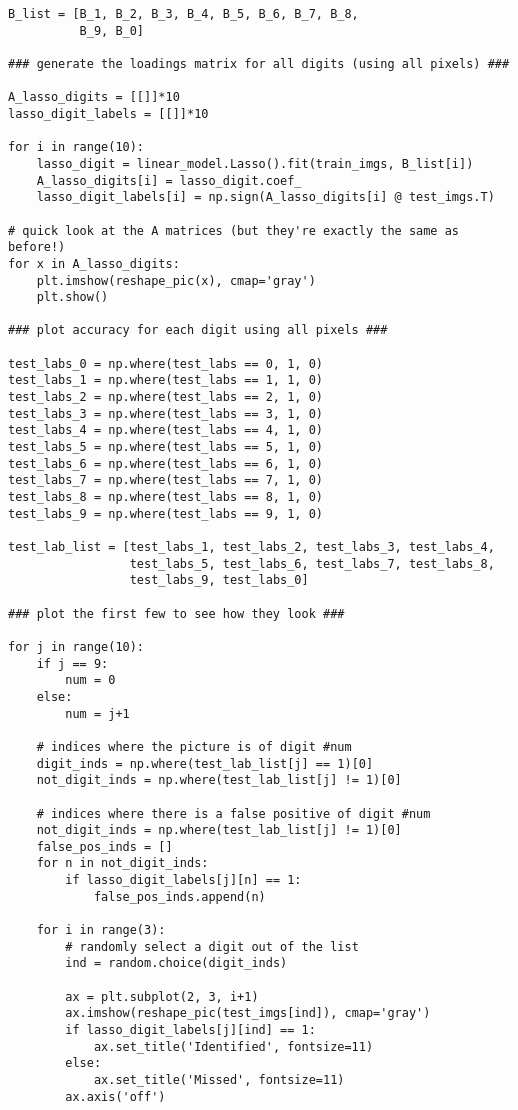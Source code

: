 \documentclass[10pt]{article}
\begin{document}
\begin{lstlisting}
B_list = [B_1, B_2, B_3, B_4, B_5, B_6, B_7, B_8,
          B_9, B_0]

### generate the loadings matrix for all digits (using all pixels) ###

A_lasso_digits = [[]]*10
lasso_digit_labels = [[]]*10

for i in range(10):
    lasso_digit = linear_model.Lasso().fit(train_imgs, B_list[i])
    A_lasso_digits[i] = lasso_digit.coef_
    lasso_digit_labels[i] = np.sign(A_lasso_digits[i] @ test_imgs.T)

# quick look at the A matrices (but they're exactly the same as before!)
for x in A_lasso_digits:
    plt.imshow(reshape_pic(x), cmap='gray')
    plt.show()

### plot accuracy for each digit using all pixels ###

test_labs_0 = np.where(test_labs == 0, 1, 0)
test_labs_1 = np.where(test_labs == 1, 1, 0)
test_labs_2 = np.where(test_labs == 2, 1, 0)
test_labs_3 = np.where(test_labs == 3, 1, 0)
test_labs_4 = np.where(test_labs == 4, 1, 0)
test_labs_5 = np.where(test_labs == 5, 1, 0)
test_labs_6 = np.where(test_labs == 6, 1, 0)
test_labs_7 = np.where(test_labs == 7, 1, 0)
test_labs_8 = np.where(test_labs == 8, 1, 0)
test_labs_9 = np.where(test_labs == 9, 1, 0)

test_lab_list = [test_labs_1, test_labs_2, test_labs_3, test_labs_4,
                 test_labs_5, test_labs_6, test_labs_7, test_labs_8,
                 test_labs_9, test_labs_0]

### plot the first few to see how they look ###

for j in range(10):
    if j == 9:
        num = 0
    else:
        num = j+1
        
    # indices where the picture is of digit #num  
    digit_inds = np.where(test_lab_list[j] == 1)[0]
    not_digit_inds = np.where(test_lab_list[j] != 1)[0]

    # indices where there is a false positive of digit #num
    not_digit_inds = np.where(test_lab_list[j] != 1)[0]
    false_pos_inds = []
    for n in not_digit_inds:
        if lasso_digit_labels[j][n] == 1:
            false_pos_inds.append(n)
    
    for i in range(3):
        # randomly select a digit out of the list
        ind = random.choice(digit_inds)
        
        ax = plt.subplot(2, 3, i+1)
        ax.imshow(reshape_pic(test_imgs[ind]), cmap='gray')
        if lasso_digit_labels[j][ind] == 1:
            ax.set_title('Identified', fontsize=11)
        else:
            ax.set_title('Missed', fontsize=11)
        ax.axis('off')


\end{lstlisting}
\end{document}

